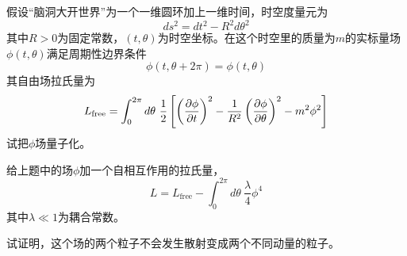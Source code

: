\documentclass[CJK]{beamer}
\begin{document}
\begin{frame}
\bch
假设“脑洞大开世界”为一个一维圆环加上一维时间，时空度量元为
$$ds^2 = dt^2 - R^2 d\theta^2$$
其中$R>0$为固定常数，$(t,\theta)$为时空坐标。在这个时空里的质量为$m$的实标量场$\phi(t,\theta)$满足周期性边界条件
$$\phi(t,\theta+2\pi) = \phi(t,\theta)$$
其自由场拉氏量为
$$L_{\rm free} = \int_0^{2\pi}d\theta\ \frac{1}{2}\left[\left(\frac{\partial\phi}{\partial t}\right)^2-\frac{1}{R^2}\left(\frac{\partial\phi}{\partial\theta}\right)^2-m^2\phi^2\right]$$
试把$\phi$场量子化。

\ech
\end{frame}


\begin{frame}
\bch
给上题中的场$\phi$加一个自相互作用的拉氏量，
$$L = L_{\mathrm{free}} - \int_0^{2\pi}d\theta\ \frac{\lambda}{4}\phi^4$$
其中$\lambda\ll 1$为耦合常数。

试证明，这个场的两个粒子不会发生散射变成两个不同动量的粒子。

\ech
\end{frame}
\end{document}
